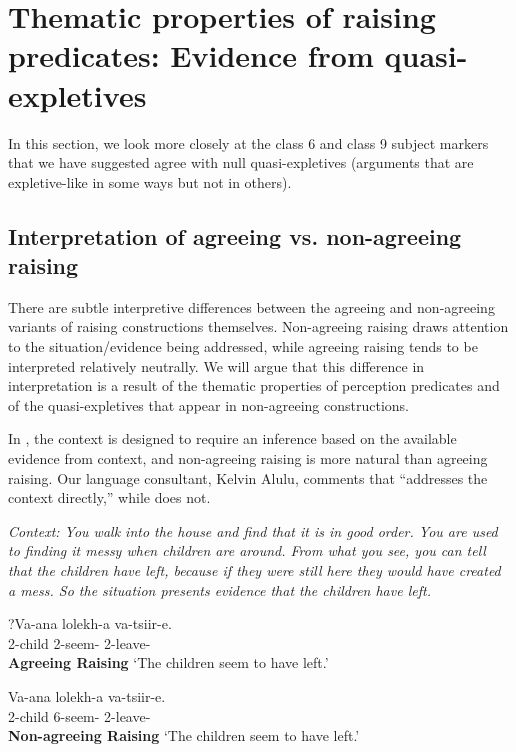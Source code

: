 \documentclass[output=paper,colorlinks,citecolor=brown
]{langscibook}
\begin{document}
\section{Thematic properties of raising predicates: Evidence from quasi-expletives} \label{sec:johnson:ThematicProperties}

In this section, we look more closely at the class 6 and class 9 subject markers that we have suggested agree with null quasi-expletives (arguments that are expletive-like in some ways but not in others).

\subsection{Interpretation of agreeing vs. non-agreeing raising} \label{sec:johnson:AgrVsNonAgr}

There are subtle interpretive differences between the agreeing and non-agreeing variants of raising constructions themselves. Non-agreeing raising draws attention to the situation/evidence being addressed, while agreeing raising tends to be interpreted relatively neutrally. We will argue that this difference in interpretation is a result of the thematic properties of perception predicates and of the quasi-expletives that appear in non-agreeing constructions. 

In , the context is designed to require an inference based on the available evidence from context, and non-agreeing raising is more natural than agreeing raising. Our language consultant, Kelvin Alulu, comments that  ``addresses the context directly,'' while  does not. 

\ea\label{ex:johnson:DisorganizedHouse}

\textit{Context: You walk into the house and find that it is in good order. You are used to finding it messy when children are around. From what you see, you can tell that the children have left, because if they were still here they would have created a mess. So the situation presents evidence that the children have left.}

\begin{xlist}

\ex\label{ex:johnson:AgrRaisingDisorganizedHouse}
\gll ?Va-ana lolekh-a va-tsiir-e.\\
2-child 2\Sm-seem-\Fv{} 2\Sm-leave-\Pst{} \\\hfill\textbf{Agreeing Raising}
\glt `The children seem to have left.'

\ex\label{ex:johnson:NonAgrRaisingDisorganizedHouse}
\gll Va-ana lolekh-a va-tsiir-e.\\
2-child 6\Sm-seem-\Fv{} 2\Sm-leave-\Pst{} \\\hfill\textbf{Non-agreeing Raising}
\glt `The children seem to have left.'


\end{xlist}
\end{document}
